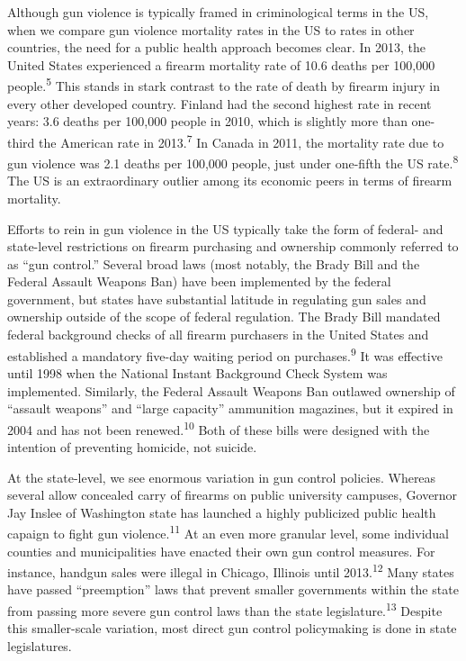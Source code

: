 \documentclass[]{article}
\begin{document}
Although gun violence is typically framed in criminological terms in the
US, when we compare gun violence mortality rates in the US to rates in
other countries, the need for a public health approach becomes clear. In
2013, the United States experienced a firearm mortality rate of 10.6
deaths per 100,000 people.\textsuperscript{5} This stands in stark
contrast to the rate of death by firearm injury in every other developed
country. Finland had the second highest rate in recent years: 3.6 deaths
per 100,000 people in 2010, which is slightly more than one-third the
American rate in 2013.\textsuperscript{7} In Canada in 2011, the
mortality rate due to gun violence was 2.1 deaths per 100,000 people,
just under one-fifth the US rate.\textsuperscript{8} The US is an
extraordinary outlier among its economic peers in terms of firearm
mortality.

Efforts to rein in gun violence in the US typically take the form of
federal- and state-level restrictions on firearm purchasing and
ownership commonly referred to as ``gun control.'' Several broad laws
(most notably, the Brady Bill and the Federal Assault Weapons Ban) have
been implemented by the federal government, but states have substantial
latitude in regulating gun sales and ownership outside of the scope of
federal regulation. The Brady Bill mandated federal background checks of
all firearm purchasers in the United States and established a mandatory
five-day waiting period on purchases.\textsuperscript{9} It was
effective until 1998 when the National Instant Background Check System
was implemented. Similarly, the Federal Assault Weapons Ban outlawed
ownership of ``assault weapons'' and ``large capacity'' ammunition
magazines, but it expired in 2004 and has not been
renewed.\textsuperscript{10} Both of these bills were designed with the
intention of preventing homicide, not suicide.

At the state-level, we see enormous variation in gun control policies.
Whereas several allow concealed carry of firearms on public university
campuses, Governor Jay Inslee of Washington state has launched a highly
publicized public health capaign to fight gun
violence.\textsuperscript{11} At an even more granular level, some
individual counties and municipalities have enacted their own gun
control measures. For instance, handgun sales were illegal in Chicago,
Illinois until 2013.\textsuperscript{12} Many states have passed
``preemption'' laws that prevent smaller governments within the state
from passing more severe gun control laws than the state
legislature.\textsuperscript{13} Despite this smaller-scale variation,
most direct gun control policymaking is done in state legislatures.
\end{document}

